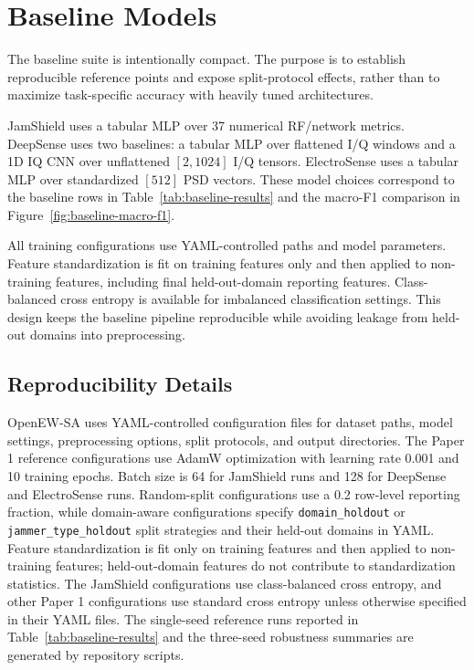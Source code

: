 \documentclass[11pt]{article}
\newcommand{\artifact}[1]{\texttt{#1}}
\begin{document}
\section{Baseline Models}

The baseline suite is intentionally compact. The purpose is to establish reproducible reference points and expose split-protocol effects, rather than to maximize task-specific accuracy with heavily tuned architectures.

JamShield uses a tabular MLP over 37 numerical RF/network metrics. DeepSense uses two baselines: a tabular MLP over flattened I/Q windows and a 1D IQ CNN over unflattened $[2, 1024]$ I/Q tensors. ElectroSense uses a tabular MLP over standardized $[512]$ PSD vectors. These model choices correspond to the baseline rows in Table~\ref{tab:baseline-results} and the macro-F1 comparison in Figure~\ref{fig:baseline-macro-f1}.

All training configurations use YAML-controlled paths and model parameters. Feature standardization is fit on training features only and then applied to non-training features, including final held-out-domain reporting features. Class-balanced cross entropy is available for imbalanced classification settings. This design keeps the baseline pipeline reproducible while avoiding leakage from held-out domains into preprocessing.

\subsection{Reproducibility Details}

OpenEW-SA uses YAML-controlled configuration files for dataset paths, model settings, preprocessing options, split protocols, and output directories. The Paper 1 reference configurations use AdamW optimization with learning rate 0.001 and 10 training epochs. Batch size is 64 for JamShield runs and 128 for DeepSense and ElectroSense runs. Random-split configurations use a 0.2 row-level reporting fraction, while domain-aware configurations specify \artifact{domain\_holdout} or \artifact{jammer\_type\_holdout} split strategies and their held-out domains in YAML. Feature standardization is fit only on training features and then applied to non-training features; held-out-domain features do not contribute to standardization statistics. The JamShield configurations use class-balanced cross entropy, and other Paper 1 configurations use standard cross entropy unless otherwise specified in their YAML files. The single-seed reference runs reported in Table~\ref{tab:baseline-results} and the three-seed robustness summaries are generated by repository scripts.
\end{document}
